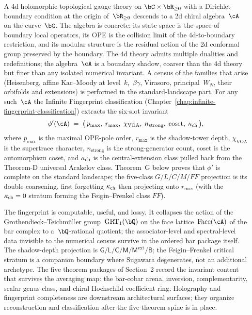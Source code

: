 \noindent
A 4d holomorphic-topological gauge theory on $\bC\times\bR_{\ge 0}$
with a Dirichlet boundary condition at the origin of~$\bR_{\ge 0}$
descends to a 2d chiral algebra~$\cA$ on the curve~$\bC$. The algebra
is concrete: its state space is the space of boundary local
operators, its OPE is the collision limit of the 4d-to-boundary
restriction, and its modular structure is the residual action of the
2d conformal group preserved by the boundary. The 4d theory admits
multiple dualities and redefinitions; the algebra~$\cA$ is a
boundary shadow, coarser than the 4d theory but finer than any
isolated numerical invariant. A census of the families that arise
(Heisenberg, affine Kac--Moody at level~$k$,~$\beta\gamma$, Virasoro,
principal~$W_N$, their orbifolds and extensions) is performed in
the standard-landscape part. For any such~$\cA$ the Infinite Fingerprint classification
(Chapter~\ref{chap:infinite-fingerprint-classification}) extracts
the six-slot invariant
\[
 \phi'(\cA) \;=\;
 \bigl(\,p_{\max},\;r_{\max},\;\chi_{\mathrm{VOA}},\;
 n_{\mathrm{strong}},\;\mathrm{coset},\;\kch\,\bigr),
\]
where $p_{\max}$ is the maximal OPE-pole order, $r_{\max}$ is the
shadow-tower depth, $\chi_{\mathrm{VOA}}$ is the supertrace
character, $n_{\mathrm{strong}}$ is the strong-generator count,
$\mathrm{coset}$ is the automorphism coset, and $\kappa_{\mathrm{ch}}$ is the
central-extension class pulled back from the Theorem-D universal
Arakelov class. Theorem~G below proves that $\phi'$ is complete on
the standard landscape; the five-class $G/L/C/M/FF$
projection is its double coarsening, first forgetting $\kappa_{\mathrm{ch}}$ then
projecting onto $r_{\max}$ (with the $\kappa_{\mathrm{ch}}=0$ stratum forming the
Feigin--Frenkel class $FF$).

The fingerprint is computable, useful, and lossy. It collapses the
action of the Grothendieck--Teichm{\"u}ller group~$\GRTone(\bQ)$ on
the face lattice~$\Face(\cA)$ of the bar complex to a~$\bQ$-rational
quotient; the associator-level and spectral-level data invisible to
the numerical census survive in the ordered bar package itself. The
shadow-depth projection is
$\mathsf G/\mathsf L/\mathsf C/\mathsf M/
\mathsf M^{\mathrm{ext}}/\mathsf B$; the Feigin--Frenkel critical
stratum is a companion boundary where Sugawara degenerates, not an
additional archetype. The five theorem packages of Section~2 record
the invariant content that
survives the averaging map: the bar-cobar arena, inversion,
complementarity, scalar genus class, and chiral Hochschild coefficient
ring. Holography and fingerprint completeness are downstream
architectural surfaces; they organize reconstruction and
classification after the five-theorem spine is in place.

